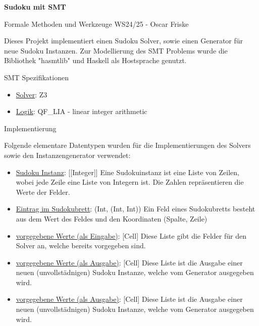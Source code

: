 

\usepackage{listings}



\begin{Large}
    \textsf{\textbf{Sudoku mit SMT}}

    Formale Methoden und Werkzeuge WS24/25 - Oscar Friske
\end{Large}
\vspace{2ex}

Dieses Projekt implementiert einen Sudoku Solver, sowie einen Generator für neue Sudoku Instanzen. Zur Modellierung des SMT Problems wurde die Bibliothek "hasmtlib" und Haskell als Hostsprache genutzt.

\vspace{2ex}

\begin{Large}
    SMT Spezifikationen
\end{Large}
\begin{itemize}
  \item \underline{Solver}: Z3
  \item \underline{Logik}: QF\_LIA - linear integer arithmetic
\end{itemize}
\vspace{2ex}

\begin{Large}
    Implementierung
\end{Large}
\vspace{2ex}

Folgende elementare Datentypen wurden für die Implementierungen des Solvers sowie den Instanzengenerator verwendet:
\begin{itemize}
    \item \underline{Sudoku Instanz}: [[Integer]] \newline
    Eine Sudokuinstanz ist eine Liste von Zeilen, wobei jede Zeile eine Liste von Integern ist. Die Zahlen repräsentieren die Werte der Felder.
    \item \underline{Eintrag im Sudokubrett}: (Int, (Int, Int)) \newline
    Ein Feld eines Sudokubretts besteht aus dem Wert des Feldes und den Koordinaten (Spalte, Zeile)
    \item \underline{vorgegebene Werte (als Eingabe)}: [Cell] \newline
    Diese Liste gibt die Felder für den Solver an, welche bereits vorgegeben sind.
    \item \underline{vorgegebene Werte (als Ausgabe)}: [Cell] \newline
    Diese Liste ist die Ausgabe einer neuen (unvollstädnigen) Sudoku Instanze, welche vom Generator ausgegeben wird.
    \item \underline{vorgegebene Werte (als Ausgabe)}: [Cell] \newline
    Diese Liste ist die Ausgabe einer neuen (unvollstädnigen) Sudoku Instanze, welche vom Generator ausgegeben wird.
\end{itemize}

